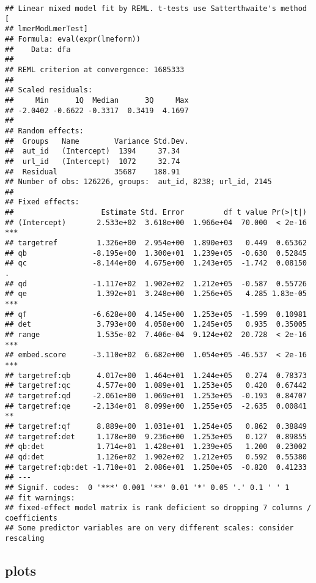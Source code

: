 \documentclass[
  12pt,
  oneside]{book}
\begin{document}
\begin{verbatim}
## Linear mixed model fit by REML. t-tests use Satterthwaite's method [
## lmerModLmerTest]
## Formula: eval(expr(lmeform))
##    Data: dfa
## 
## REML criterion at convergence: 1685333
## 
## Scaled residuals: 
##     Min      1Q  Median      3Q     Max 
## -2.0402 -0.6622 -0.3317  0.3419  4.1697 
## 
## Random effects:
##  Groups   Name        Variance Std.Dev.
##  aut_id   (Intercept)  1394     37.34  
##  url_id   (Intercept)  1072     32.74  
##  Residual             35687    188.91  
## Number of obs: 126226, groups:  aut_id, 8238; url_id, 2145
## 
## Fixed effects:
##                    Estimate Std. Error         df t value Pr(>|t|)    
## (Intercept)       2.533e+02  3.618e+00  1.966e+04  70.000  < 2e-16 ***
## targetref         1.326e+00  2.954e+00  1.890e+03   0.449  0.65362    
## qb               -8.195e+00  1.300e+01  1.239e+05  -0.630  0.52845    
## qc               -8.144e+00  4.675e+00  1.243e+05  -1.742  0.08150 .  
## qd               -1.117e+02  1.902e+02  1.212e+05  -0.587  0.55726    
## qe                1.392e+01  3.248e+00  1.256e+05   4.285 1.83e-05 ***
## qf               -6.628e+00  4.145e+00  1.253e+05  -1.599  0.10981    
## det               3.793e+00  4.058e+00  1.245e+05   0.935  0.35005    
## range             1.535e-02  7.406e-04  9.124e+02  20.728  < 2e-16 ***
## embed.score      -3.110e+02  6.682e+00  1.054e+05 -46.537  < 2e-16 ***
## targetref:qb      4.017e+00  1.464e+01  1.244e+05   0.274  0.78373    
## targetref:qc      4.577e+00  1.089e+01  1.253e+05   0.420  0.67442    
## targetref:qd     -2.061e+00  1.069e+01  1.253e+05  -0.193  0.84707    
## targetref:qe     -2.134e+01  8.099e+00  1.255e+05  -2.635  0.00841 ** 
## targetref:qf      8.889e+00  1.031e+01  1.254e+05   0.862  0.38849    
## targetref:det     1.178e+00  9.236e+00  1.253e+05   0.127  0.89855    
## qb:det            1.714e+01  1.428e+01  1.239e+05   1.200  0.23002    
## qd:det            1.126e+02  1.902e+02  1.212e+05   0.592  0.55380    
## targetref:qb:det -1.710e+01  2.086e+01  1.250e+05  -0.820  0.41233    
## ---
## Signif. codes:  0 '***' 0.001 '**' 0.01 '*' 0.05 '.' 0.1 ' ' 1
## fit warnings:
## fixed-effect model matrix is rank deficient so dropping 7 columns / coefficients
## Some predictor variables are on very different scales: consider rescaling
\end{verbatim}

\subsection{plots}\label{plots-4}
\end{document}
